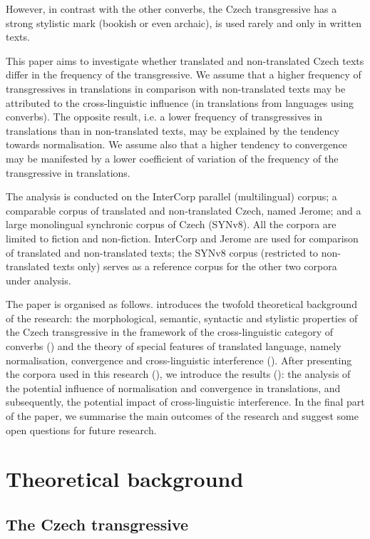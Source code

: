 \documentclass[output=paper,russian]{langsci/langscibook}
\begin{document}
However, in contrast with the other converbs, the Czech transgressive has a strong stylistic mark (bookish or even archaic), is used rarely and only in written texts. 

This paper aims to investigate whether translated and non-translated Czech texts differ in the frequency of the transgressive. We assume that a higher frequency of transgressives in translations in comparison with non-translated texts may be attributed to the cross-linguistic influence (in translations from languages using converbs). The opposite result, i.e. a lower frequency of transgressives in translations than in non-translated texts, may be explained by the tendency towards normalisation. We assume also that a higher tendency to convergence may be manifested by a lower coefficient of variation of the frequency of the transgressive in translations. 

The analysis is conducted on the InterCorp parallel (multilingual) corpus; a comparable corpus of translated and non-translated Czech, named Jerome; and a large monolingual synchronic corpus of Czech (SYNv8). All the corpora are limited to fiction and non-fiction. InterCorp and Jerome are used for comparison of translated and non-translated texts; the SYNv8 corpus (restricted to non-translated texts only) serves as a reference corpus for the other two corpora under analysis.

The paper is organised as follows.  introduces the twofold theoretical background of the research: the morphological, semantic, syntactic and stylistic properties of the Czech transgressive in the framework of the cross-linguistic category of converbs () and the theory of special features of translated language, namely normalisation, convergence and cross-linguistic interference (). After presenting the corpora used in this research (), we introduce the results (): the analysis of the potential influence of normalisation and convergence in translations, and subsequently, the potential impact of cross-linguistic interference. In the final part of the paper, we summarise the main outcomes of the research and suggest some open questions for future research.

\section{Theoretical background}\label{olga:tb}

\subsection{The Czech transgressive}\label{olga:czt}
\end{document}
